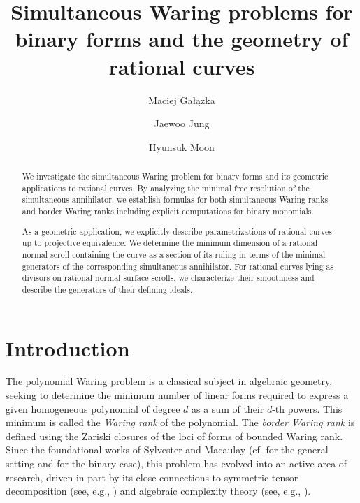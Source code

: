 \documentclass[a4paper, 11pt]{amsart}
\title[Simultaneous apolarity and rational curves]{Simultaneous Waring problems for binary forms and the geometry of rational curves}
\author{Maciej Ga{\l}\k{a}zka \and Jaewoo Jung \and Hyunsuk Moon}
\numberwithin{theorem}{section}
\theoremstyle{definition}
\numberwithin{equation}{section}
\begin{document}
\begin{abstract}
We investigate the simultaneous Waring problem for binary forms and its geometric applications to rational curves.
By analyzing the minimal free resolution of the simultaneous annihilator, we establish formulas for both simultaneous Waring ranks and border Waring ranks including explicit computations for binary monomials.

As a geometric application, we explicitly describe parametrizations of rational curves up to projective equivalence.
We determine the minimum dimension of a rational normal scroll containing the curve as a section of its ruling in terms of the minimal generators of the corresponding simultaneous annihilator.
For rational curves lying as divisors on rational normal surface scrolls, we characterize their smoothness and describe the generators of their defining ideals.
\end{abstract}



\maketitle

\section{Introduction}
The polynomial Waring problem is a classical subject in algebraic geometry, seeking to determine the minimum number of linear forms required to express a given homogeneous polynomial of degree $d$ as a sum of their $d$-th powers.
This minimum is called the \emph{Waring rank} of the polynomial.
The \emph{border Waring rank} is defined using the Zariski closures of the loci of forms of bounded Waring rank.
Since the foundational works of Sylvester and Macaulay (cf. \cite{MR1735271} for the general setting and \cite{MR2754189} for the binary case), this problem has evolved into an active area of research, driven in part by its close connections to symmetric tensor decomposition (see, e.g., \cite{MR2447451}) and algebraic complexity theory (see, e.g., \cite{MR2628829,MR3729273}).
\end{document}
